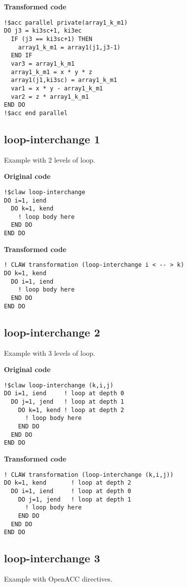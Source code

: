 \textbf{Transformed code}
\begin{lstlisting}
!$acc parallel private(array1_k_m1)
DO j3 = ki3sc+1, ki3ec
  IF (j3 == ki3sc+1) THEN
    array1_k_m1 = array1(j1,j3-1)
  END IF
  var3 = array1_k_m1
  array1_k_m1 = x * y * z
  array1(j1,ki3sc) = array1_k_m1
  var1 = x * y - array1_k_m1
  var2 = z * array1_k_m1
END DO
!$acc end parallel
\end{lstlisting}


\subsection{loop-interchange 1}
\label{loop-interchange1}
Example with 2 levels of loop. 

\textbf{Original code}
\begin{lstlisting}
!$claw loop-interchange
DO i=1, iend
  DO k=1, kend
    ! loop body here
  END DO
END DO
\end{lstlisting}

\textbf{Transformed code}
\begin{lstlisting}
! CLAW transformation (loop-interchange i < -- > k)
DO k=1, kend
  DO i=1, iend
    ! loop body here
  END DO
END DO
\end{lstlisting}

\subsection{loop-interchange 2}
\label{loop-interchange2}
Example with 3 levels of loop. 

\textbf{Original code}
\begin{lstlisting}
!$claw loop-interchange (k,i,j)
DO i=1, iend     ! loop at depth 0
  DO j=1, jend   ! loop at depth 1
    DO k=1, kend ! loop at depth 2
      ! loop body here
    END DO
  END DO
END DO
\end{lstlisting}

\textbf{Transformed code}
\begin{lstlisting}
! CLAW transformation (loop-interchange (k,i,j))
DO k=1, kend       ! loop at depth 2
  DO i=1, iend     ! loop at depth 0
    DO j=1, jend   ! loop at depth 1
      ! loop body here
    END DO
  END DO
END DO
\end{lstlisting}

\subsection{loop-interchange 3}
\label{loop-interchange3}
Example with OpenACC directives. 

